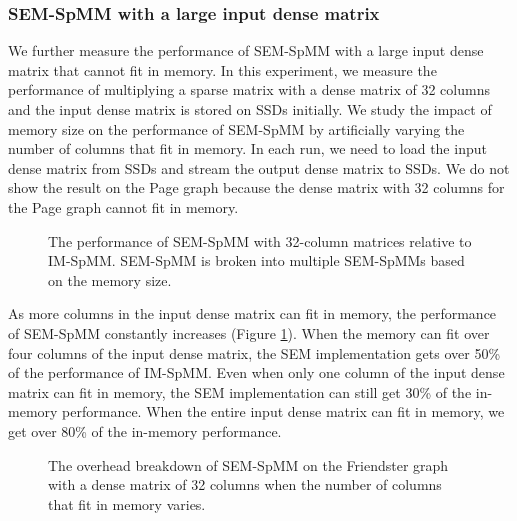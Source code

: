 \subsubsection{SEM-SpMM with a large input dense matrix}

We further measure the performance of SEM-SpMM with a large input dense matrix
that cannot fit in memory. In this experiment, we measure the performance of
multiplying a sparse matrix with a dense matrix of 32 columns and the input
dense matrix is stored on SSDs initially. We study the impact of memory size
on the performance of SEM-SpMM by artificially varying the number of columns
that fit in memory. In each run, we need to load the input dense matrix from
SSDs and stream the output dense matrix to SSDs. We do not show the result on
the Page graph because the dense matrix with 32 columns for the Page graph
cannot fit in memory.

\begin{figure}
	\begin{center}
		\footnotesize
		
		\caption{The performance of SEM-SpMM with 32-column matrices
			relative to IM-SpMM. SEM-SpMM is broken into multiple SEM-SpMMs
		based on the memory size.}
		\label{perf:spmm32}
	\end{center}
\end{figure}

As more columns in the input dense matrix can fit in memory, the performance
of SEM-SpMM constantly increases (Figure \ref{perf:spmm32}). When the memory
can fit over four columns of the input dense matrix, the SEM implementation
gets over 50\% of the performance of IM-SpMM. Even when only one column of
the input dense matrix
can fit in memory, the SEM implementation can still get 30\% of the in-memory
performance. When the entire input dense matrix can fit in memory, we get over
80\% of the in-memory performance.

\begin{figure}
	\begin{center}
		\footnotesize
		
		\caption{The overhead breakdown of SEM-SpMM on the Friendster
			graph with a dense matrix of 32 columns when the number
			of columns that fit in memory varies. }
		\label{perf:spmm32_over}
	\end{center}
\end{figure}

